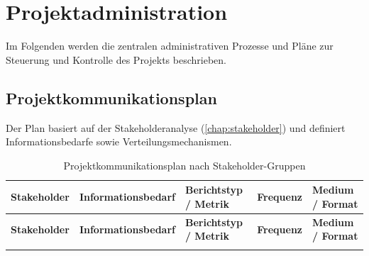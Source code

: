 \chapter{Projektadministration}
Im Folgenden werden die zentralen administrativen Prozesse und Pläne zur Steuerung und Kontrolle des Projekts beschrieben.

\section{Projektkommunikationsplan}
\label{sec:kommunikationsplan}

Der Plan basiert auf der Stakeholderanalyse (\ref{chap:stakeholder}) und definiert Informationsbedarfe sowie Verteilungsmechanismen.

    {\footnotesize
        \begin{xltabular}{\textwidth}{@{}>{\hsize}X>{\hsize}X>{\hsize}X>{\hsize}X>{\hsize}X@{}}
            \caption{Projektkommunikationsplan nach Stakeholder-Gruppen} \label{tab:kommunikationsplan} \\
            \hline
            \textbf{Stakeholder} & \textbf{Informationsbedarf} & \textbf{Berichtstyp / Metrik} & \textbf{Frequenz} & \textbf{Medium / Format} \\
            \hline
            \endfirsthead

            \hline
            \textbf{Stakeholder} & \textbf{Informationsbedarf} & \textbf{Berichtstyp / Metrik} & \textbf{Frequenz} & \textbf{Medium / Format} \\
            \hline
            \endhead

            \hline
            \endfoot


\end{xltabular}}
